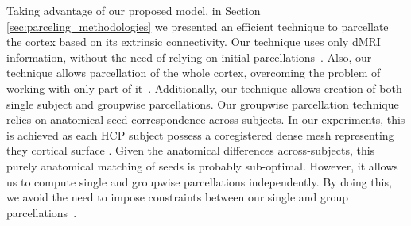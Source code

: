 Taking advantage of our proposed model, in Section \ref{sec:parceling_methodologies}
we presented an efficient
technique to parcellate the cortex based on its extrinsic connectivity. Our
technique uses only dMRI information, without the need of relying on
initial parcellations~\citep{Clarkson2010}. Also, our technique allows 
parcellation of the whole cortex, overcoming the problem of working with only part
of it~\citep{Lefranc2016, Roca2009, ThiebautdeSchotten2014, ThiebautdeSchotten2016}.
Additionally, our technique allows creation of both single subject and
groupwise parcellations. Our groupwise parcellation technique relies on anatomical
seed-correspondence across subjects. In our experiments, this is achieved as
each HCP subject possess a coregistered dense mesh representing they cortical
surface \citep{Glasser2013}. Given the anatomical differences across-subjects,
this purely anatomical matching of seeds is probably sub-optimal. However, it
allows us to compute single and groupwise parcellations independently. By doing
this, we avoid the need to impose constraints between our single and group
parcellations~\citep{Clarkson2010, Roca2010, Paristot2015}.

